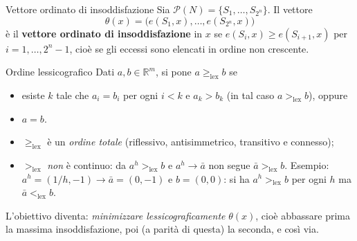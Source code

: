 \documentclass[12pt,a4paper,twoside]{book}
\theoremstyle{plain}
\theoremstyle{definition}
\begin{document}
\begin{defbox}{Vettore ordinato di insoddisfazione}
Sia $\mathcal{P}(N)=\{S_1,\dots,S_{2^n}\}$. Il vettore
\[
  \theta(x)=\bigl(e(S_1,x),\dots,e(S_{2^n},x)\bigr)
\]
è il \textbf{vettore ordinato di insoddisfazione} in $x$ se
$e(S_i,x)\ge e(S_{i+1},x)$ per $i=1,\dots,2^n-1$, cioè se gli eccessi sono
elencati in ordine non crescente.
\end{defbox}

\begin{defbox}{Ordine lessicografico}
Dati $a,b\in\mathbb{R}^m$, si pone $a\ge_{\mathrm{lex}}b$ se
\begin{itemize}
  \item esiste $k$ tale che $a_i=b_i$ per ogni $i<k$ e $a_k>b_k$ (in tal caso $a>_{\mathrm{lex}}b$), oppure
  \item $a=b$.
\end{itemize}
\begin{itemize}
  \item $\ge_{\mathrm{lex}}$ è un \emph{ordine totale} (riflessivo, antisimmetrico, transitivo e connesso);
  \item $>_{\mathrm{lex}}$ \emph{non} è continuo: da $a^h>_{\mathrm{lex}}b$ e $a^h\to\bar a$ non segue $\bar a>_{\mathrm{lex}}b$.
        Esempio: $a^h=(1/h,-1)\to\bar a=(0,-1)$ e $b=(0,0)$: si ha $a^h>_{\mathrm{lex}}b$ per ogni $h$
        ma $\bar a<_{\mathrm{lex}}b$.
\end{itemize}
\end{defbox}

L'obiettivo diventa: \emph{minimizzare lessicograficamente} $\theta(x)$, cioè
abbassare prima la massima insoddisfazione, poi (a parità di questa) la
seconda, e così via.
\end{document}
